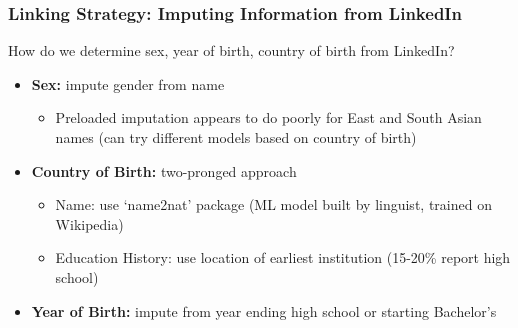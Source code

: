 \documentclass[xcolor=dvipsnames, compress, 12pt, aspectratio=169, handout]{beamer}
\begin{document}
\begin{frame}
    \frametitle{Linking Strategy: Imputing Information from LinkedIn}
    How do we determine sex, year of birth, country of birth from LinkedIn? 
    \vspace{2mm}
    \begin{itemize}
        \item \textbf{Sex:} impute gender from name
        \begin{itemize}
            \item Preloaded imputation appears to do poorly for East and South Asian names (can try different models based on country of birth)
        \end{itemize}
        \vspace{2mm}
        \item \textbf{Country of Birth:} two-pronged approach 
        \begin{itemize}
            \item Name: use `name2nat' package (ML model built by linguist, trained on Wikipedia)
            \item Education History: use location of earliest institution (15-20\% report high school)
        \end{itemize}
        \vspace{2mm}
        \item \textbf{Year of Birth:} impute from year ending high school or starting Bachelor's
    \end{itemize}
\end{frame}

    
    
    
\end{document}
